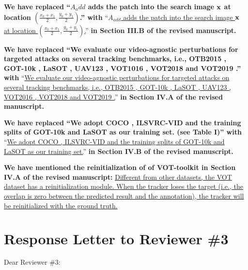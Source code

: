 \documentclass[12pt]{article}
\begin{document}
\textbf{We have  replaced ``$A_add$ adds the patch into the search image $\textbf x$ at location $(\frac{x_0+x_1}{2},\frac{y_0+y_1}{2})$.'' with}
``\uline{$A_{add}$ adds the patch into the search image $\textbf x$ at location $(\frac{x_0+x_1}{2},\frac{y_0+y_1}{2})$.}''
\textbf{in Section III.B of the revised manuscript.}

\textbf{We have replaced ``We evaluate our video-agnostic perturbations for targeted attacks on several tracking benchmarks, i.e., OTB2015 \cite{OTB}, GOT-10k \cite{GOT-10k}, LaSOT \cite{LaSOT}, UAV123 \cite{UAV123}, VOT1016 \cite{VOT2016}, VOT2018 \cite{VOT2018} and VOT2019 \cite{VOT2019}.'' with}
``\uline{We evaluate our video-agnostic perturbations for targeted attacks on several tracking benchmarks, i.e., OTB2015 \cite{OTB}, GOT-10k \cite{GOT-10k}, LaSOT \cite{LaSOT}, UAV123 \cite{UAV123}, VOT2016 \cite{VOT2016}, VOT2018 \cite{VOT2018} and VOT2019 \cite{VOT2019}.}''
\textbf{in Section IV.A of the revised manuscript.}

\textbf{We have replaced ``We adopt COCO \cite{COCO}, ILSVRC-VID \cite{VID} and the training splits of GOT-10k \cite{GOT-10k} and LaSOT \cite{LaSOT} as our training set. (see Table I)'' with}
``\uline{We adopt COCO \cite{COCO}, ILSVRC-VID \cite{VID} and the training splits of GOT-10k \cite{GOT-10k} and LaSOT \cite{LaSOT} as our training set.}''
\textbf{in Section IV.B of the revised manuscript.}

\textbf{We have mentioned the reinitialization of of VOT-toolkit in Section IV.A of the revised manuscript:}
\uline{Different from other datasets, the VOT dataset has a reinitialization module. When the tracker loses the target (i.e., the overlap is zero between the predicted result and the annotation), the tracker will be reinitialized with the ground truth.}

\clearpage
\newpage
{\centering\section*{Response Letter to Reviewer \#3}}
\noindent Dear Reviewer \#3:
\end{document}
